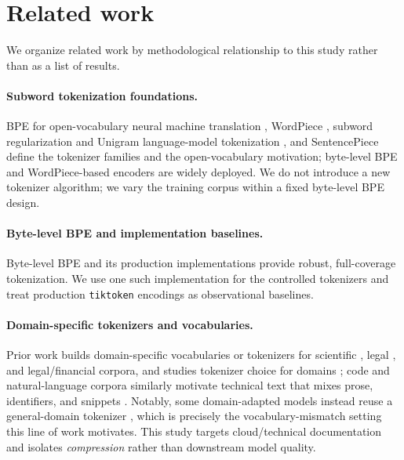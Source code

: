 \section{Related work}
\label{sec:related}

We organize related work by methodological relationship to this study rather than
as a list of results.

\paragraph{Subword tokenization foundations.}
BPE for open-vocabulary neural machine translation \citep{sennrich2016bpe},
WordPiece \citep{schuster2012wordpiece}, subword regularization and Unigram
language-model tokenization \citep{kudo2018subword}, and SentencePiece
\citep{kudo2018sentencepiece} define the tokenizer families and the
open-vocabulary motivation; byte-level BPE \citep{radford2019gpt2} and
WordPiece-based encoders \citep{devlin2019bert} are widely deployed. We do not
introduce a new tokenizer algorithm; we vary the training corpus within a fixed
byte-level BPE design.

\paragraph{Byte-level BPE and implementation baselines.}
Byte-level BPE \citep{radford2019gpt2} and its production implementations
\citep{openai2026tiktoken,huggingface2026tokenizers} provide robust,
full-coverage tokenization. We use one such implementation for the controlled
tokenizers and treat production \texttt{tiktoken} encodings as observational
baselines.

\paragraph{Domain-specific tokenizers and vocabularies.}
Prior work builds domain-specific vocabularies or tokenizers for scientific
\citep{beltagy2019scibert}, legal \citep{chalkidis2020legalbert}, and
legal/financial \citep{bommarito2025kl3m} corpora, and studies tokenizer choice
for domains \citep{dagan2024tokenizer}; code and natural-language corpora
similarly motivate technical text that mixes prose, identifiers, and snippets
\citep{feng2020codebert}. Notably, some domain-adapted models instead reuse a
general-domain tokenizer \citep{lee2019biobert}, which is precisely the
vocabulary-mismatch setting this line of work motivates. This study targets
cloud/technical documentation and isolates \emph{compression} rather than
downstream model quality.

